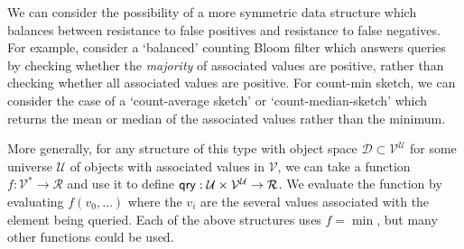 We can consider the possibility of a more symmetric data structure which balances between resistance to false positives and resistance to false negatives. For example, consider a `balanced' counting Bloom filter which answers queries by checking whether the \emph{majority} of associated values are positive, rather than checking whether all associated values are positive. For count-min sketch, we can consider the case of a `count-average sketch' or `count-median-sketch' which returns the mean or median of the associated values rather than the minimum.

More generally, for any structure of this type with object space $\mathcal{D} \subset \mathcal{V}^\mathcal{U}$ for some universe $\mathcal{U}$ of objects with associated values in $\mathcal{V}$, we can take a function $f: \mathcal{V}^* \to \mathcal{R}$ and use it to define $\mathsf{qry}: \mathcal{U} \times \mathcal{V}^\mathcal{U} \to \mathcal{R}$. We evaluate the function by evaluating $f(v_0,\ldots)$ where the $v_i$ are the several values associated with the element being queried. Each of the above structures uses $f = \min$, but many other functions could be used.